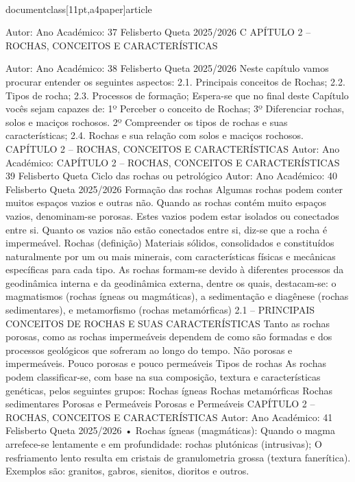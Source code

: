 \\documentclass[11pt,a4paper]{article}
\begin{document}

Autor:
Ano Académico:
37
Felisberto Queta
2025/2026
C
APÍTULO 2 
–
ROCHAS, CONCEITOS E 
CARACTERÍSTICAS\

Autor:
Ano Académico:
38
Felisberto Queta
2025/2026
Neste capítulo vamos procurar entender os seguintes aspectos:
2.1. Principais conceitos de Rochas;
2.2. Tipos de rocha;
2.3. Processos de formação;
Espera-se que no final deste Capítulo vocês sejam capazes de:
1º Perceber o conceito de Rochas; 
3º Diferenciar rochas, solos e maciços rochosos.
2º Compreender os tipos de rochas e suas características;
2.4. Rochas e sua relação com solos e maciços rochosos.
CAPÍTULO 2 
–
 ROCHAS, CONCEITOS E CARACTERÍSTICAS
Autor:
Ano Académico:
CAPÍTULO 2 
–
 ROCHAS, CONCEITOS E CARACTERÍSTICAS 39
Felisberto Queta
Ciclo das rochas ou petrológico
Autor:
Ano Académico:
40
Felisberto Queta
2025/2026
Formação das rochas
Algumas rochas podem conter muitos espaços vazios e outras não.
Quando as rochas contém muito espaços vazios, denominam-se porosas.
Estes vazios podem estar isolados ou conectados entre si. Quanto os vazios
não estão conectados entre si, diz-se que a rocha é impermeável.
Rochas (definição)
Materiais sólidos, consolidados
e constituídos naturalmente
por um ou mais minerais, com
características físicas e
mecânicas específicas para
cada tipo.
As rochas formam-se devido à
diferentes processos da
geodinâmica interna e da
geodinâmica externa, dentre
os quais, destacam-se: o
magmatismos (rochas ígneas
ou magmáticas), a
sedimentação e diagênese
(rochas sedimentares), e
metamorfismo (rochas
metamórficas)
2.1 – PRINCIPAIS CONCEITOS DE ROCHAS E SUAS CARACTERÍSTICAS
Tanto as rochas porosas, como as rochas impermeáveis dependem de
como são formadas e dos processos geológicos que sofreram ao longo do
tempo.
Não porosas e
impermeáveis.
Pouco porosas e
pouco permeáveis
Tipos de rochas
As rochas podem classificar-se, com base na sua composição, textura e 
características genéticas, pelos seguintes grupos:
Rochas ígneas Rochas metamórficas
 Rochas sedimentares
Porosas e
Permeáveis
Porosas e
Permeáveis
CAPÍTULO 2 
–
 ROCHAS, CONCEITOS E CARACTERÍSTICAS
Autor:
Ano Académico:
41
Felisberto Queta
2025/2026
• Rochas ígneas (magmáticas):
Quando o magma arrefece-se lentamente e em profundidade: rochas plutónicas (intrusivas);
O resfriamento lento resulta em cristais de granulometria grossa (textura fanerítica). Exemplos são: 
granitos, gabros, sienitos, dioritos e outros.
\end{document}
